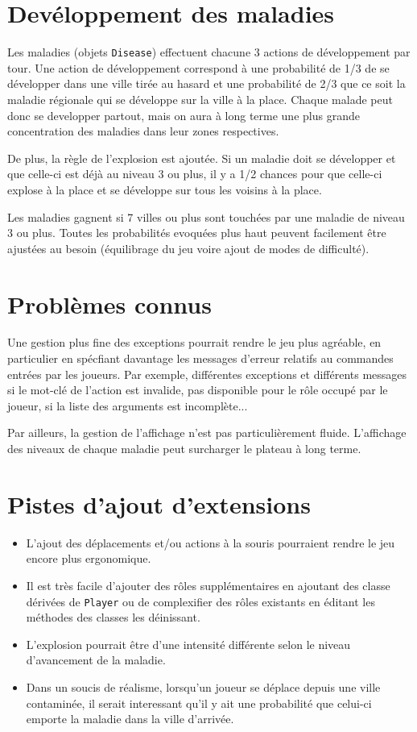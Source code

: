 \documentclass[10pt,a4paper]{article}
\begin{document}
	\section*{Devéloppement des maladies}
	Les maladies (objets \texttt{Disease}) effectuent chacune 3 actions de développement par tour. Une action de développement correspond à une probabilité de 1/3 de se développer dans une ville tirée au hasard et une probabilité de 2/3 que ce soit la maladie régionale qui se développe sur la ville à la place. Chaque malade peut donc se developper partout, mais on aura à long terme une plus grande concentration des maladies dans leur zones respectives.

	De plus, la règle de l'explosion est ajoutée. Si un maladie doit se développer et que celle-ci est déjà au niveau 3 ou plus, il y a 1/2 chances pour que celle-ci explose à la place et se développe sur tous les voisins à la place.

	Les maladies gagnent si 7 villes ou plus sont touchées par une maladie de niveau 3 ou plus. Toutes les probabilités evoquées plus haut peuvent facilement être ajustées au besoin (équilibrage du jeu voire ajout de modes de difficulté).
	
	\section*{Problèmes connus}
	Une gestion plus fine des exceptions pourrait rendre le jeu plus agréable, en particulier en spécfiant davantage les messages d'erreur relatifs au commandes entrées par les joueurs. Par exemple, différentes exceptions et différents messages si le mot-clé de l'action est invalide, pas disponible pour le rôle occupé par le joueur, si la liste des arguments est incomplète...
	
	Par ailleurs, la gestion de l'affichage n'est pas particulièrement fluide. L'affichage des niveaux de chaque maladie peut surcharger le plateau à long terme.
	
	
	\section*{Pistes d'ajout d'extensions}
	\begin{itemize}
	\item L'ajout des déplacements et/ou actions à la souris pourraient rendre le jeu encore plus ergonomique.
	\item Il est très facile d'ajouter des rôles supplémentaires en ajoutant des classe dérivées de \texttt{Player} ou de complexifier des rôles existants en éditant les méthodes des classes les déinissant.
	\item L'explosion pourrait être d'une intensité différente selon le niveau d'avancement de la maladie.
	\item Dans un soucis de réalisme, lorsqu'un joueur se déplace depuis une ville contaminée, il serait interessant qu'il y ait une probabilité que celui-ci emporte la maladie dans la ville d'arrivée.		
	\end{itemize}		
			
		
\end{document}
